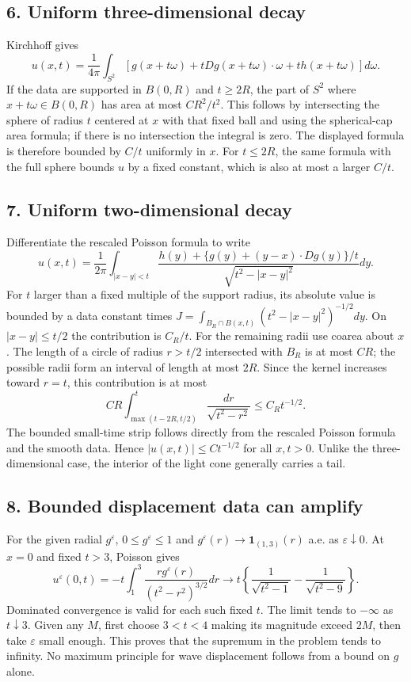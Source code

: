 \subsection*{6. Uniform three-dimensional decay}
Kirchhoff gives
\[
 u(x,t)=\frac1{4\pi}\int_{S^2}
 [g(x+t\omega)+tDg(x+t\omega)\cdot\omega+th(x+t\omega)]d\omega.
\]
If the data are supported in $B(0,R)$ and $t\ge2R$, the part of
$S^2$ where $x+t\omega\in B(0,R)$ has area at most $C R^2/t^2$.
This follows by intersecting the sphere of radius $t$ centered at
$x$ with that fixed ball and using the spherical-cap area formula;
if there is no intersection the integral is zero.
The displayed formula is therefore bounded by $C/t$ uniformly in
$x$. For $t\le2R$, the same formula with the full sphere bounds
$u$ by a fixed constant, which is also at most a larger $C/t$.

\subsection*{7. Uniform two-dimensional decay}
Differentiate the rescaled Poisson formula to write
\[
 u(x,t)=\frac1{2\pi}\int_{|x-y|<t}
 \frac{h(y)+\{g(y)+(y-x)\cdot Dg(y)\}/t}
                       {\sqrt{t^2-|x-y|^2}}dy.
\]
For $t$ larger than a fixed multiple of the support radius, its
absolute value is bounded by a data constant times
$J=\int_{B_R\cap B(x,t)}(t^2-|x-y|^2)^{-1/2}dy$.
On $|x-y|\le t/2$ the contribution is $C_R/t$.
For the remaining radii use coarea about $x$. The length of a circle
of radius $r>t/2$ intersected with $B_R$ is at most $C R$;
the possible radii form an interval of length at most $2R$.
Since the kernel increases toward $r=t$, this contribution is at most
\[
 C R\int_{\max(t-2R,t/2)}^t\frac{dr}{\sqrt{t^2-r^2}}
 \le C_Rt^{-1/2}.
\]
The bounded small-time strip follows directly from the rescaled
Poisson formula and the smooth data. Hence $|u(x,t)|\le Ct^{-1/2}$
for all $x,t>0$. Unlike the three-dimensional case, the interior
of the light cone generally carries a tail.

\subsection*{8. Bounded displacement data can amplify}
For the given radial $g^\varepsilon$, $0\le g^\varepsilon\le1$
and $g^\varepsilon(r)\to\mathbf1_{(1,3)}(r)$ a.e. as
$\varepsilon\downarrow0$. At $x=0$ and fixed $t>3$, Poisson gives
\[
 u^\varepsilon(0,t)=-t\int_1^3
        \frac{r g^\varepsilon(r)}{(t^2-r^2)^{3/2}}dr
 \longrightarrow t\left\{\frac1{\sqrt{t^2-1}}
                         -\frac1{\sqrt{t^2-9}}\right\}.
\]
Dominated convergence is valid for each such fixed $t$.
The limit tends to $-\infty$ as $t\downarrow3$.
Given any $M$, first choose $3<t<4$ making its magnitude exceed
$2M$, then take $\varepsilon$ small enough. This proves that the
supremum in the problem tends to infinity. No maximum principle
for wave displacement follows from a bound on $g$ alone.

